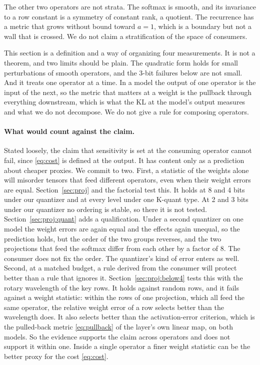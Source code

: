\documentclass[10pt]{article}
\begin{document}
The other two operators are not strata. The softmax is smooth, and its invariance to a row
constant is a symmetry of constant rank, a quotient. The recurrence has a metric that grows
without bound toward $a = 1$, which is a boundary but not a wall that is crossed. We do not claim
a stratification of the space of consumers.

This section is a definition and a way of organizing four measurements. It is not a theorem, and
two limits should be plain. The quadratic form holds for small perturbations of smooth operators, and
the 3-bit failures below are not small. And it treats one operator at a time. In a model the
output of one operator is the input of the next, so the metric that matters at a weight is the
pullback through everything downstream, which is what the KL at the model's output measures and
what we do not decompose. We do not give a rule for composing operators.

\paragraph{What would count against the claim.} Stated loosely, the claim that sensitivity
is set at the consuming operator cannot fail, since \eqref{eq:cost} is defined at the output. It
has content only as a prediction about cheaper proxies. We commit to two. First, a statistic of
the weights alone will misorder tensors that feed different operators, even when their weight
errors are equal. Section~\ref{sec:proj} and the factorial test this. It holds at 8 and 4 bits
under our quantizer and at every level under one K-quant type. At 2 and 3 bits under our
quantizer no ordering is stable, so there it is not tested. Section~\ref{sec:proj:quant} adds a
qualification. Under a second quantizer on one model the weight errors are again equal and the
effects again unequal, so the prediction holds, but the order of the two groups reverses, and the
two projections that feed the softmax differ from each other by a factor of 8. The consumer
does not fix the order. The quantizer's kind of error enters as well. Second, at a
matched budget, a rule derived from the consumer will protect better than a rule that ignores it.
Section~\ref{sec:proj:below4} tests this with the rotary wavelength of the key rows. It holds
against random rows, and it fails against a weight statistic: within the rows of one projection,
which all feed the same operator, the relative weight error of a row selects better than the
wavelength does. It also selects better than the activation-error criterion, which is the
pulled-back metric \eqref{eq:pullback} of the layer's own linear map, on both models. So the evidence supports the claim across operators and does not support it
within one. Inside a single operator a finer weight statistic can be the better proxy for the
cost \eqref{eq:cost}.
\end{document}

